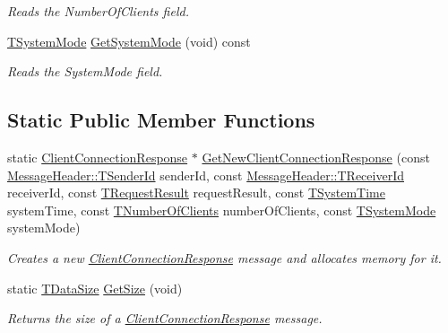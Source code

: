 \begin{DoxyCompactItemize}
\begin{DoxyCompactList}\small\item\em Reads the Number\-Of\-Clients field. \end{DoxyCompactList}\item 
\hyperlink{class_terra_swarm_1_1_synchronous_1_1_client_connection_response_a828bc4f350b4f661c541d988c79f05e9}{T\-System\-Mode} \hyperlink{class_terra_swarm_1_1_synchronous_1_1_client_connection_response_a462cfecc85eac135682b2fe3ea971526}{Get\-System\-Mode} (void) const 
\begin{DoxyCompactList}\small\item\em Reads the System\-Mode field. \end{DoxyCompactList}\end{DoxyCompactItemize}
\subsection*{Static Public Member Functions}
\begin{DoxyCompactItemize}
\item 
static \hyperlink{class_terra_swarm_1_1_synchronous_1_1_client_connection_response}{Client\-Connection\-Response} $\ast$ \hyperlink{class_terra_swarm_1_1_synchronous_1_1_client_connection_response_ae38339e5fc2703a0ddb58da353722ea8}{Get\-New\-Client\-Connection\-Response} (const \hyperlink{class_terra_swarm_1_1_message_header_a516b36855e2aad7cfbf8770f1b42784f}{Message\-Header\-::\-T\-Sender\-Id} sender\-Id, const \hyperlink{class_terra_swarm_1_1_message_header_aa3260702b182b6f88ddbdd3416e98df0}{Message\-Header\-::\-T\-Receiver\-Id} receiver\-Id, const \hyperlink{class_terra_swarm_1_1_synchronous_1_1_client_connection_response_a4b55c1f852e288564e5aa00e882f80d5}{T\-Request\-Result} request\-Result, const \hyperlink{class_terra_swarm_1_1_synchronous_1_1_client_connection_response_a7b389f7e89631ce7c758c3a26c46c303}{T\-System\-Time} system\-Time, const \hyperlink{class_terra_swarm_1_1_synchronous_1_1_client_connection_response_adc391c9557f0acfdb0763043058cdf83}{T\-Number\-Of\-Clients} number\-Of\-Clients, const \hyperlink{class_terra_swarm_1_1_synchronous_1_1_client_connection_response_a828bc4f350b4f661c541d988c79f05e9}{T\-System\-Mode} system\-Mode)
\begin{DoxyCompactList}\small\item\em Creates a new \hyperlink{class_terra_swarm_1_1_synchronous_1_1_client_connection_response}{Client\-Connection\-Response} message and allocates memory for it. \end{DoxyCompactList}\item 
static \hyperlink{namespace_terra_swarm_a092e6ec9739175076ae3106783f5c1b6}{T\-Data\-Size} \hyperlink{class_terra_swarm_1_1_synchronous_1_1_client_connection_response_af665b5c5ef472eddc40f46ad185b2d90}{Get\-Size} (void)
\begin{DoxyCompactList}\small\item\em Returns the size of a \hyperlink{class_terra_swarm_1_1_synchronous_1_1_client_connection_response}{Client\-Connection\-Response} message. \end{DoxyCompactList}\end{DoxyCompactItemize}
